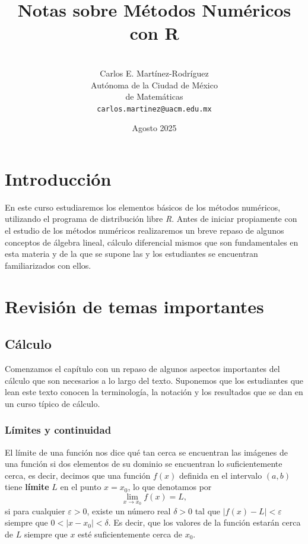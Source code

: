 \documentclass[12pt]{article}
\title{Notas sobre Métodos Numéricos con R}
\author{\\Carlos E. Martínez-Rodríguez \\\Universidad Autónoma de la Ciudad de México \\\Academia de Matemáticas \\\texttt{carlos.martinez@uacm.edu.mx}}
\date{Agosto 2025}
\begin{document}

\maketitle
\tableofcontents

\section{Introducción}

En este curso estudiaremos los elementos básicos de los métodos numéricos, utilizando el programa de distribución libre \textit{R}. Antes de iniciar propiamente con el estudio de los métodos numéricos realizaremos un breve repaso de algunos conceptos de álgebra lineal, cálculo diferencial mismos que son fundamentales en esta materia y de la que se supone las y los estudiantes se encuentran familiarizados con ellos.

\section{Revisión de temas importantes}

\subsection{Cálculo}

Comenzamos el capítulo con un repaso de algunos aspectos importantes del cálculo que son necesarios a lo largo del texto. Suponemos que los estudiantes que lean este texto conocen la terminología, la notación y los resultados que se dan en un curso típico de cálculo.

\subsubsection{Límites y continuidad}

El límite de una función nos dice qué tan cerca se encuentran las imágenes de una función si dos elementos de su dominio se encuentran lo suficientemente cerca, es decir, decimos que una función $f(x)$ definida en el intervalo $(a,b)$ tiene \textbf{límite} $L$ en el punto $x = x_0$, lo que denotamos por $$\lim_{x \to x_0} f(x) = L,$$ si para cualquier $\varepsilon > 0$, existe un número real $\delta > 0$ tal que $|f(x) - L| < \varepsilon$ siempre que $0 < |x - x_0| < \delta $. Es decir, que los valores de la función estarán cerca de $L$ siempre que $x$ esté suficientemente cerca de $x_0$.
\bigskip
\end{document}
